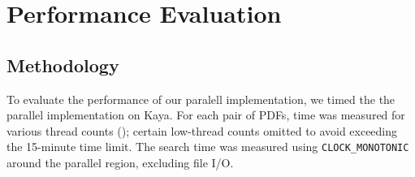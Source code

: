 \documentclass[11pt,a4paper]{article}
\begin{document}
\setcounter{section}{4}

\section{Performance Evaluation}
\label{sec:perf}


\subsection{Methodology}

To evaluate the performance of our paralell implementation, we timed the the parallel implementation on Kaya. For each pair of PDFs, time was measured for various thread counts (); certain low-thread counts omitted to avoid exceeding the 15-minute time limit. The search time was measured using \texttt{CLOCK\_MONOTONIC} around the parallel region, excluding file I/O.
\end{document}
